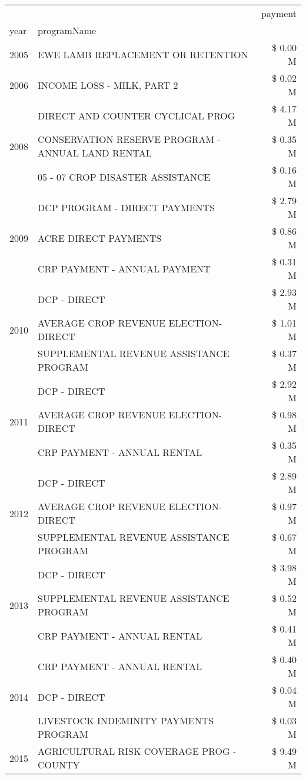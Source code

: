 \begin{tabular}{llr}
\toprule
 &  & payment \\
year & programName &  \\
\midrule
2005 & EWE LAMB REPLACEMENT OR RETENTION & \$ 0.00 M \\
\cline{1-3}
2006 & INCOME LOSS - MILK, PART 2 & \$ 0.02 M \\
\cline{1-3}
\multirow[t]{3}{*}{2008} & DIRECT AND COUNTER CYCLICAL PROG & \$ 4.17 M \\
 & CONSERVATION RESERVE PROGRAM - ANNUAL LAND RENTAL & \$ 0.35 M \\
 & 05 - 07 CROP DISASTER ASSISTANCE & \$ 0.16 M \\
\cline{1-3}
\multirow[t]{3}{*}{2009} & DCP PROGRAM - DIRECT PAYMENTS & \$ 2.79 M \\
 & ACRE DIRECT PAYMENTS & \$ 0.86 M \\
 & CRP PAYMENT - ANNUAL PAYMENT & \$ 0.31 M \\
\cline{1-3}
\multirow[t]{3}{*}{2010} & DCP - DIRECT & \$ 2.93 M \\
 & AVERAGE CROP REVENUE ELECTION-DIRECT & \$ 1.01 M \\
 & SUPPLEMENTAL REVENUE ASSISTANCE PROGRAM & \$ 0.37 M \\
\cline{1-3}
\multirow[t]{3}{*}{2011} & DCP - DIRECT & \$ 2.92 M \\
 & AVERAGE CROP REVENUE ELECTION-DIRECT & \$ 0.98 M \\
 & CRP PAYMENT - ANNUAL RENTAL & \$ 0.35 M \\
\cline{1-3}
\multirow[t]{3}{*}{2012} & DCP - DIRECT & \$ 2.89 M \\
 & AVERAGE CROP REVENUE ELECTION-DIRECT & \$ 0.97 M \\
 & SUPPLEMENTAL REVENUE ASSISTANCE PROGRAM & \$ 0.67 M \\
\cline{1-3}
\multirow[t]{3}{*}{2013} & DCP - DIRECT & \$ 3.98 M \\
 & SUPPLEMENTAL REVENUE ASSISTANCE PROGRAM & \$ 0.52 M \\
 & CRP PAYMENT - ANNUAL RENTAL & \$ 0.41 M \\
\cline{1-3}
\multirow[t]{3}{*}{2014} & CRP PAYMENT - ANNUAL RENTAL & \$ 0.40 M \\
 & DCP - DIRECT & \$ 0.04 M \\
 & LIVESTOCK INDEMINITY PAYMENTS PROGRAM & \$ 0.03 M \\
\cline{1-3}
\multirow[t]{3}{*}{2015} & AGRICULTURAL RISK COVERAGE PROG - COUNTY & \$ 9.49 M \\

\end{tabular}
